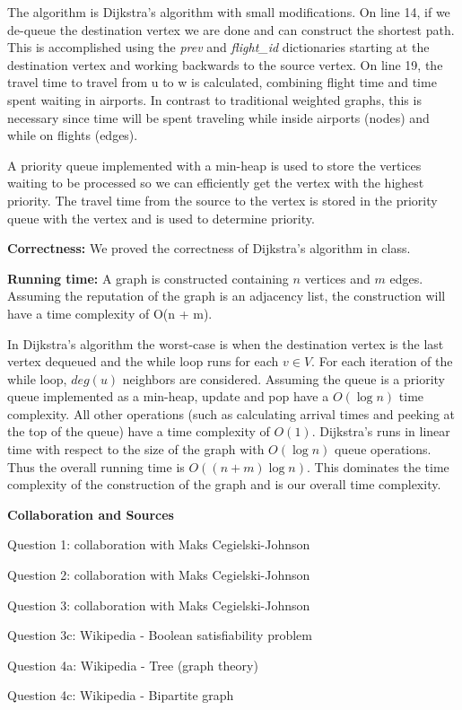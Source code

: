 \documentclass[11pt]{article}
\newcommand\correctness{\vspace{.10in}\textbf{Correctness: }}
\newcommand\runtime{\vspace{.10in}\textbf{Running time: }}
\begin{document}
The algorithm is Dijkstra's algorithm with small modifications. On line 14, if we de-queue the destination vertex we are done and can construct the shortest path. This is accomplished using the \textit{prev} and \textit{flight\_id} dictionaries starting at the destination vertex and working backwards to the source vertex. On line 19, the travel time to travel from u to w is calculated, combining flight time and time spent waiting in airports. In contrast to traditional weighted graphs, this is necessary since time will be spent traveling while inside airports (nodes) and while on flights (edges).

A priority queue implemented with a min-heap is used to store the vertices waiting to be processed so we can efficiently get the vertex with the highest priority. The travel time from the source to the vertex is stored in the priority queue with the vertex and is used to determine priority.

\correctness We proved the correctness of Dijkstra's algorithm in class.

\runtime A graph is constructed containing $n$ vertices and $m$ edges. Assuming the reputation of the graph is an adjacency list, the construction will have a time complexity of O(n + m).

	In Dijkstra's algorithm the worst-case is when the destination vertex is the last vertex dequeued and the while loop runs for each $v \in V$. For each iteration of the while loop, $deg(u)$ neighbors are considered. Assuming the queue is a priority queue implemented as a min-heap, update and pop have a $O(\log n)$ time complexity. All other operations (such as calculating arrival times and peeking at the top of the queue) have a time complexity of $O(1)$. Dijkstra's runs in linear time with respect to the size of the graph with $O(\log n)$ queue operations. Thus the overall running time is $O((n + m)\log n)$. This dominates the time complexity of the construction of the graph and is our overall time complexity.
	
	
\newpage	
\textbf{\huge Collaboration and Sources}
\newline

Question 1: collaboration with Maks Cegielski-Johnson

Question 2: collaboration with Maks Cegielski-Johnson

Question 3: collaboration with Maks Cegielski-Johnson

Question 3c: Wikipedia - Boolean satisfiability problem

Question 4a: Wikipedia - Tree (graph theory)

Question 4c: Wikipedia - Bipartite graph
\end{document}

